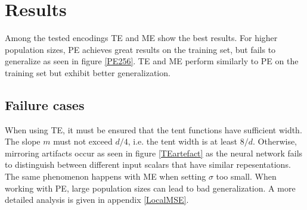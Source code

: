\section{Results}
Among the tested encodings TE and ME show the best results. For higher population sizes, PE achieves great results on the training set, but fails to generalize as seen in figure \ref{PE256}. TE and ME perform similarly to PE on the training set but exhibit better generalization.

\subsection*{Failure cases}
When using TE, it must be ensured that the tent functions have sufficient width. 
The slope $m$ must not exceed $d/4$, i.e. the tent width is at least $8/d$. 
Otherwise, mirroring artifacts occur as seen in figure \ref{TEartefact} as the neural network fails to distinguish between different input scalars that have similar repesentations. The same phenomenon happens with ME when setting $\sigma$ too small. 
When working with PE, large population sizes can lead to bad generalization. A more detailed analysis is given in appendix \ref{LocalMSE}. 
